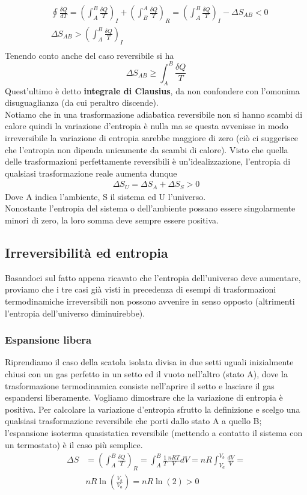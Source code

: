 \documentclass[10pt,a4paper]{article}
\begin{document}
\begin{align*}
	&\oint \frac{\delta Q}{dT}=\left( \int_A^B  \frac{\delta Q}{T}\right)_I + \left(\int_B^A \frac{\delta Q}{T}\right)_R =\left(\int_A^B \frac{\delta Q}{T}\right)_I  - \Delta S_{AB} < 0\\
	&\Delta S_{AB} > \left(\int_A^B \frac{\delta Q}{T}\right)_I \\
\end{align*}Tenendo conto anche del caso reversibile si ha
\[\Delta S_{AB} \geq \int_A^B \frac{\delta Q}{T}\]
Quest'ultimo è detto \textbf{integrale di Clausius}, da non confondere con l'omonima disuguaglianza (da cui peraltro discende).\\
Notiamo che in una trasformazione adiabatica reversibile non si hanno scambi di calore quindi la variazione d'entropia è nulla ma se questa avvenisse in modo irreversibile la variazione di entropia sarebbe maggiore di zero (ciò ci suggerisce che l'entropia non dipenda unicamente da scambi di calore). Visto che quella delle trasformazioni perfettamente reversibili è un'idealizzazione, l'entropia di qualsiasi trasformazione reale aumenta dunque 
\begin{align*}
	\Delta S_U = \Delta S_A + \Delta S_S > 0
\end{align*}
Dove A indica l'ambiente, S il sistema ed U l'universo.\\
Nonostante l'entropia del sistema o dell'ambiente possano essere singolarmente minori di zero, la loro somma deve sempre essere positiva. 
\subsection{Irreversibilità ed entropia}
Basandoci sul fatto appena ricavato che l'entropia dell'universo deve aumentare, proviamo che i tre casi già visti in precedenza di esempi di trasformazioni termodinamiche irreversibili non possono avvenire in senso opposto (altrimenti l'entropia dell'universo diminuirebbe). 
\subsubsection{Espansione libera}
Riprendiamo il caso della scatola isolata divisa in due setti uguali inizialmente chiusi con un gas perfetto in un setto ed il vuoto nell'altro (stato A), dove la trasformazione termodinamica consiste nell'aprire il setto e lasciare il gas espandersi liberamente. Vogliamo dimostrare che la variazione di entropia è positiva. Per calcolare la variazione d'entropia sfrutto la definizione e scelgo una qualsiasi trasformazione reversibile che porti dallo stato A a quello B; l'espansione isoterma quasistatica reversibile (mettendo a contatto il sistema con un termostato) è il caso più semplice.
\begin{align*}
	\Delta S &= \left(\int_{A}^{B}\frac{\delta Q}{T}\right)_R = \int_{A}^{B}\frac{1}{T}\frac{nRT}{V}dV =nR\int_{V_a}^{V_b}\frac{dV}{V} =\\
	&nR\ln\left(\frac{V_b}{V_a}\right)= nR\ln(2)>0
\end{align*}
\end{document}
